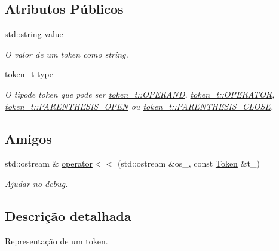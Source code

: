 \subsection*{Atributos Públicos}
\begin{DoxyCompactItemize}
\item 
std\+::string \hyperlink{structToken_a4b7142147b8598f8e24c404928d9263b}{value}
\begin{DoxyCompactList}\small\item\em O valor de um token como string. \end{DoxyCompactList}\item 
\hyperlink{structToken_a0c0bd3a78407f44bc1fd21a9da6bd85b}{token\+\_\+t} \hyperlink{structToken_adc09b3fa26576ee028d22b7ddc6aad69}{type}
\begin{DoxyCompactList}\small\item\em O tipode token que pode ser \hyperlink{structToken_a0c0bd3a78407f44bc1fd21a9da6bd85ba11f3de9b2b548c31805cf34d512ee177}{token\+\_\+t\+::\+O\+P\+E\+R\+A\+ND}, \hyperlink{structToken_a0c0bd3a78407f44bc1fd21a9da6bd85ba986496ca5b23669b8661171566a167c3}{token\+\_\+t\+::\+O\+P\+E\+R\+A\+T\+OR}, \hyperlink{structToken_a0c0bd3a78407f44bc1fd21a9da6bd85bacc3fdb5e3acc094388e75f45ada1a935}{token\+\_\+t\+::\+P\+A\+R\+E\+N\+T\+H\+E\+S\+I\+S\+\_\+\+O\+P\+EN} ou \hyperlink{structToken_a0c0bd3a78407f44bc1fd21a9da6bd85ba459697561df348fd7420e66ef9a339bf}{token\+\_\+t\+::\+P\+A\+R\+E\+N\+T\+H\+E\+S\+I\+S\+\_\+\+C\+L\+O\+SE}. \end{DoxyCompactList}\end{DoxyCompactItemize}
\subsection*{Amigos}
\begin{DoxyCompactItemize}
\item 
std\+::ostream \& \hyperlink{structToken_a065608b70f9e8c375cf12cc7fc363dcd}{operator$<$$<$} (std\+::ostream \&os\+\_\+, const \hyperlink{structToken}{Token} \&t\+\_\+)
\begin{DoxyCompactList}\small\item\em Ajudar no debug. \end{DoxyCompactList}\end{DoxyCompactItemize}


\subsection{Descrição detalhada}
Representação de um token. 

